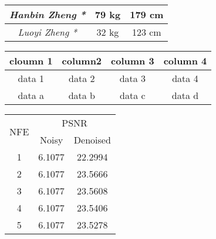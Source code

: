 \documentclass{article}
\begin{document}
\begin{tabular}{| >{\itshape}c<{*} | c <{kg} | c <{cm} |}
\hline
Hanbin Zheng & 79 & 179 \\
\hline
Luoyi Zheng & 32 & 123 \\
\hline
\end{tabular}

\begin{tabular}{cccc}
\toprule
cloumn 1 & column2 & column 3 & column 4 \\
\midrule
data 1 & data 2 & data 3 & data 4 \\
data a & data b & data c & data d \\
\bottomrule
\end{tabular}

\begin{tabular}{ccc}
\toprule
\multirow{2}{*}{NFE} & \multicolumn{2}{c}{PSNR} \\
\cline{2-3}
& Noisy & Denoised \\
\midrule
1 & 6.1077 & 22.2994 \\
2 & 6.1077 & 23.5666 \\
3 & 6.1077 & 23.5608 \\
4 & 6.1077 & 23.5406 \\
5 & 6.1077 & 23.5278 \\
\bottomrule
\end{tabular}
\end{document}
